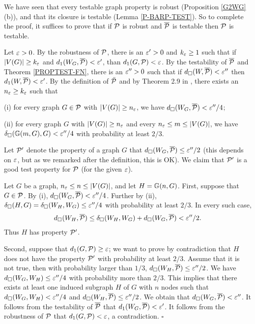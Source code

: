 \documentclass{article}
\newenvironment{proof}{\medskip\noindent{\bf Proof. }}{\hfill$\square$\medskip}
\begin{document}
\begin{proof}
We have seen that every testable graph property is robust
(Proposition \ref{G2WG}(b)), and that its closure is testable (Lemma
\ref{P-BARP-TEST}). So to complete the proof, it suffices to prove
that if $\mathcal{P}$ is robust and $\overline{\mathcal{P}}$ is testable then $\mathcal{P}$
is testable.

Let $\varepsilon>0$. By the robustness of $\mathcal{P}$, there is an $\varepsilon'>0$ and
$k_\varepsilon\ge 1$ such that if $|V(G)|\ge k_\varepsilon$ and
$d_1(W_G,\overline{\mathcal{P}})<\varepsilon'$, than $d_1(G,\mathcal{P})<\varepsilon$. By the
testability of $\overline{\mathcal{P}}$ and Theorem \ref{PROPTEST-FN}, there is
an $\varepsilon''>0$ such that if $d_\square(W, \overline{\mathcal{P}})< \varepsilon''$
then $d_1(W, \overline{\mathcal{P}})<\varepsilon'$. By the definition of $\bar{\mathcal{P}}$
and by Theorem 2.9 in \cite{BCLSV1}, there exists an $n_\varepsilon\ge
k_\varepsilon$ such that

(i) for every graph $G\in\mathcal{P}$ with $|V(G)|\geq n_\varepsilon$, we have
$d_{\square}(W_G,\overline{\mathcal{P}})<\varepsilon''/4$;

(ii) for every graph $G$ with $|V(G)|\geq n_\varepsilon$ and every $n_\varepsilon
\le m\le |V(G)|$, we have $\delta_\square({\mathbb G}(m,G),G)<\varepsilon''/4$ with
probability at least $2/3$.

Let $\mathcal{P}'$ denote the property of a graph $G$ that
$d_{\square}(W_G,\overline{\mathcal{P}})\le \varepsilon''/2$ (this depends on
$\varepsilon$, but as we remarked after the definition, this is OK). We
claim that $\mathcal{P}'$ is a good test property for $\mathcal{P}$ (for the given
$\varepsilon$).

Let $G$ be a graph, $n_\varepsilon\le n\le |V(G)|$, and let $H={\mathbb G}(n,G)$.
First, suppose that $G\in\mathcal{P}$. By (i),
$d_{\square}(W_G,\overline{\mathcal{P}})<\varepsilon''/4$. Further by (ii),
$\delta_\square(H,G)=\delta_\square(W_H,W_G)\le \varepsilon''/4$ with
probability at least $2/3$. In every such case,
\[
d_{\square}(W_H,\overline{\mathcal{P}})\le \delta_\square(W_H,W_G) +
d_{\square}(W_G,\overline{\mathcal{P}})< \varepsilon''/2.
\]
Thus $H$ has property $\mathcal{P}'$.

Second, suppose that $d_1(G,\mathcal{P})\geq \varepsilon$; we want to prove by
contradiction that $H$ does not have the property $\mathcal{P}'$ with
probability at least $2/3$. Assume that it is not true, then with
probability larger than $1/3$, $d_\square(W_H,\overline{\mathcal{P}})\le
\varepsilon''/2$. We have $d_{\square}(W_G,W_H)\le \varepsilon''/4$ with
probability more than $2/3$. This implies that there exists at least
one induced subgraph $H$ of $G$ with $n$ nodes such that
$d_{\square}(W_G,W_H)<\varepsilon''/4$ and
$d_{\square}(W_H,\overline{\mathcal{P}})\leq \varepsilon''/2$. We obtain that
$d_{\square}(W_G,\overline{\mathcal{P}})<\varepsilon''$. It follows from the
testability of $\overline{\mathcal{P}}$ that $d_1(W_G,\overline{\mathcal{P}})<\varepsilon'$.
It follows from the robustness of $\mathcal{P}$ that $d_1(G,\mathcal{P})< \varepsilon$, a
contradiction.
\end{proof}
\end{document}
